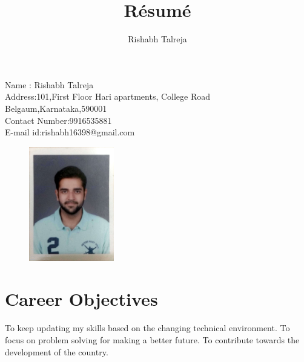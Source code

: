 \documentclass{article}
\begin{document}
	\title{R\'esum\'e}
	\author{Rishabh Talreja}
	\maketitle
	Name : Rishabh Talreja\\
   	Address:101,First Floor Hari apartments, College Road Belgaum,Karnataka,590001\\
   	Contact Number:9916535881\\
   	E-mail id:rishabh16398@gmail.com
		\begin{figure}[h]
		\hspace{10cm}
		\includegraphics[height=5cm]{pic.jpg}
	\end{figure}
	\section{Career Objectives}
To keep updating my skills based on the changing technical environment. To focus on problem
solving for making a better future. To contribute towards the development of the country.
\end{document}
